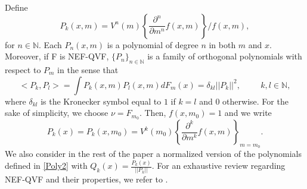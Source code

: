 Define
\begin{equation}\label{Poly1}
P_{k}(x,m)=V^{n}(m)\left\{\frac{\partial^{n}}{\partial m^{n}}f(x,m)\right\}/f(x,m),
\end{equation}
for $n\in\mathbb{N}$. Each $P_{n}(x,m)$ is a polynomial of degree $n$ in both $m$ and $x$. Moreover, if F is NEF-QVF, $\{P_{n}\}_{n\in\mathbb{N}}$ is a family of orthogonal polynomials with respect to $P_{m}$ in the sense that
\[
<P_{k},P_{l}>=\int P_{k}(x,m)P_{l}(x,m)dF_{m}(x)=\delta_{kl}||P_{k}||^{2},\hspace{1cm}k,l\in\mathbb{N},
\]
where $\delta_{kl}$ is the Kronecker symbol equal to $1$ if $k=l$ and $0$ otherwise. For the sake of simplicity, we choose $\nu=F_{m_{0}}$. Then, $f(x,m_{0})=1$ and we write
\begin{equation}\label{Poly2}
P_{k}(x)=P_{k}(x,m_{0})=V^{k}(m_{0})\left\{\frac{\partial^{k}}{\partial m^{k}}f(x,m)\right\}_{m=m_{0}}.
\end{equation}
We also consider in the rest of the paper a normalized version of the polynomials defined in \eqref{Poly2} with $Q_{k}(x)=\frac{P_{k}(x)}{||P_{k}||}$. For an exhaustive review regarding NEF-QVF and their properties, we refer to \citet{Mo82}.
